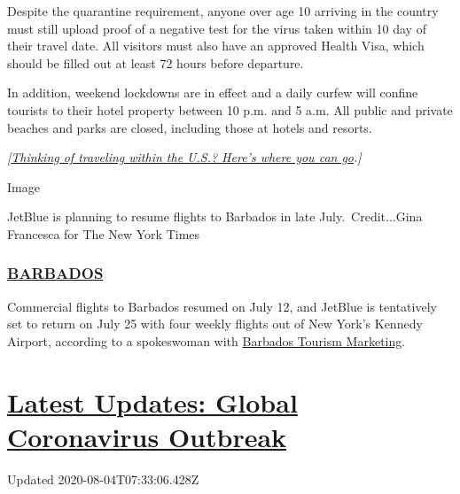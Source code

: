 Despite the quarantine requirement, anyone over age 10 arriving in the
country must still upload proof of a negative test for the virus taken
within 10 day of their travel date. All visitors must also have an
approved Health Visa, which should be filled out at least 72 hours
before departure.

In addition, weekend lockdowns are in effect and a daily curfew will
confine tourists to their hotel property between 10 p.m. and 5 a.m. All
public and private beaches and parks are closed, including those at
hotels and resorts.

\emph{{[}}\href{https://www.nytimes3xbfgragh.onion/2020/07/10/travel/state-travel-restrictions.html}{\emph{Thinking
of traveling within the U.S.? Here's where you can go}}\emph{.{]}}

Image

JetBlue is planning to resume flights to Barbados in late
July.~Credit...Gina Francesca for The New York Times

\hypertarget{barbados}{%
\subsubsection{\texorpdfstring{\href{https://gisbarbados.gov.bb/blog/commercial-air-traffic-resumes-july-12-with-protocols/}{BARBADOS}}{BARBADOS}}\label{barbados}}

Commercial flights to Barbados resumed on July 12, and JetBlue is
tentatively set to return on July 25 with four weekly flights out of New
York's Kennedy Airport, according to a spokeswoman with
\href{https://www.visitbarbados.org}{Barbados Tourism Marketing}.

\hypertarget{latest-updates-global-coronavirus-outbreak}{%
\section{\texorpdfstring{\href{https://www.nytimes3xbfgragh.onion/2020/08/03/world/coronavirus-covid-19.html?action=click\&pgtype=Article\&state=default\&region=MAIN_CONTENT_1\&context=storylines_live_updates}{Latest
Updates: Global Coronavirus
Outbreak}}{Latest Updates: Global Coronavirus Outbreak}}\label{latest-updates-global-coronavirus-outbreak}}

Updated 2020-08-04T07:33:06.428Z

